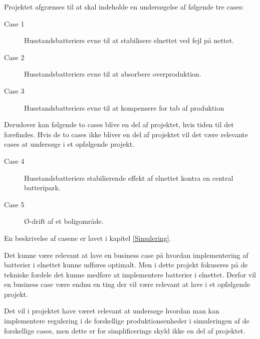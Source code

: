 
\label{Afgraensning}

Projektet afgrænses til at skal indeholde en undersøgelse af følgende tre cases:

\begin{description}
	\item[Case 1] Husstandsbatteriers evne til at stabilisere elnettet ved fejl på nettet.
	\item[Case 2] Husstandsbatteriers evne til at absorbere overproduktion.
	\item[Case 3] Husstandsbatteriers evne til at kompensere for tab af produktion 
\end{description}	
	
Derudover kan følgende to cases blive en del af projektet, hvis tiden til det forefindes. Hvis de to cases ikke bliver en del af projektet vil det være relevante cases at undersøge i et opfølgende projekt.

\begin{description}
	\item[Case 4] Husstandsbatteriers stabilierende effekt af elnettet kontra en central batteripark.
	\item[Case 5] Ø-drift af et boligområde.
\end{description}

En beskrivelse af casene er lavet i kapitel \ref{Simulering}.

Det kunne være relevant at lave en business case på hvordan implementering af batterier i elnettet kunne udføres optimalt. Men i dette projekt fokuseres på de tekniske fordele det kunne medføre at implementere batterier i elnettet. Derfor vil en business case være endnu en ting der vil være relevant at lave i et opfølgende projekt.

Det vil i projektet have været relevant at undersøge hvordan man kan implementere regulering i de forskellige produktionsenheder i simuleringen af de forskellige cases, men dette er for simplificerings skyld ikke en del af projektet.